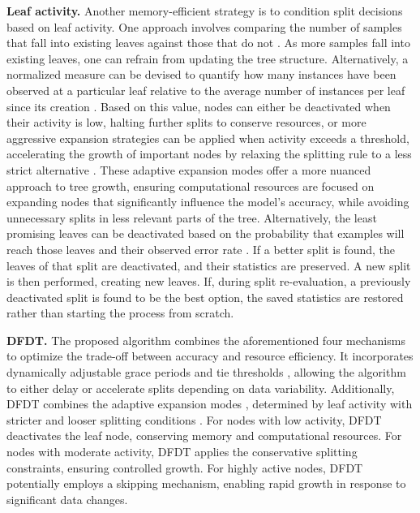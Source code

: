 \textbf{Leaf activity.} Another memory-efficient strategy is to condition split decisions based on leaf activity. One approach involves comparing the number of samples that fall into existing leaves against those that do not \cite{yang2011optimized}. As more samples fall into existing leaves, one can refrain from updating the tree structure. Alternatively, a normalized measure can be devised to quantify how many instances have been observed at a particular leaf relative to the average number of instances per leaf since its creation \cite{garcia2022green}. Based on this value, nodes can either be deactivated when their activity is low, halting further splits to conserve resources, or more aggressive expansion strategies can be applied when activity exceeds a threshold, accelerating the growth of important nodes by relaxing the splitting rule to a less strict alternative \cite{garcia2022green}. These adaptive expansion modes offer a more nuanced approach to tree growth, ensuring computational resources are focused on expanding nodes that significantly influence the model’s accuracy, while avoiding unnecessary splits in less relevant parts of the tree. Alternatively, the least promising leaves can be deactivated based on the probability that examples will reach those leaves and their observed error rate \cite{domingos2000mining}. If a better split is found, the leaves of that split are deactivated, and their statistics are preserved. A new split is then performed, creating new leaves. If, during split re-evaluation, a previously deactivated split is found to be the best option, the saved statistics are restored rather than starting the process from scratch.

\textbf{DFDT.} The proposed algorithm combines the aforementioned four mechanisms to optimize the trade-off between accuracy and resource efficiency. It incorporates dynamically adjustable grace periods \cite{garcia2018hoeffding} and tie thresholds \cite{yang2011moderated,yang2011optimized}, allowing the algorithm to either delay or accelerate splits depending on data variability. Additionally, DFDT combines the adaptive expansion modes \cite{garcia2022green}, determined by leaf activity with stricter and looser splitting conditions \cite{da2018strict,barddal2020regularized}. For nodes with low activity, DFDT deactivates the leaf node, conserving memory and computational resources. For nodes with moderate activity, DFDT applies the conservative splitting constraints, ensuring controlled growth. For highly active nodes, DFDT potentially employs a skipping mechanism, enabling rapid growth in response to significant data changes.